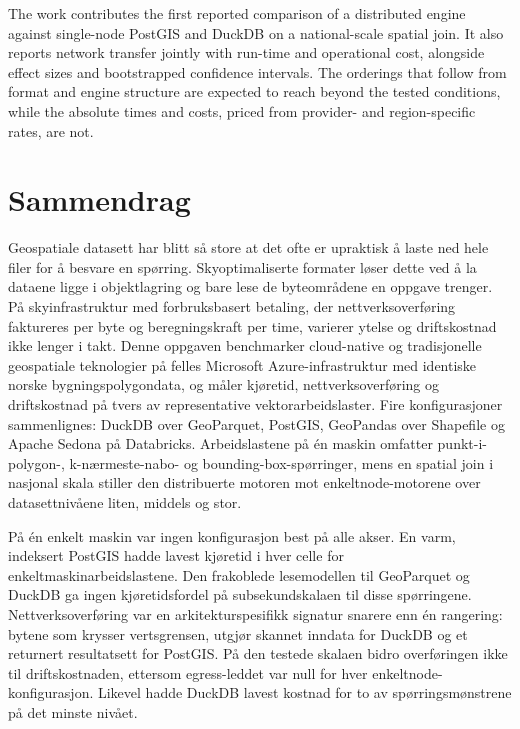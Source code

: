 The work contributes the first reported comparison of a distributed engine against single-node PostGIS and DuckDB on a national-scale spatial join. It also reports network transfer jointly with run-time and operational cost, alongside effect sizes and bootstrapped confidence intervals. The orderings that follow from format and engine structure are expected to reach beyond the tested conditions, while the absolute times and costs, priced from provider- and region-specific rates, are not.

\chapter*{Sammendrag}

Geospatiale datasett har blitt så store at det ofte er upraktisk å laste ned hele filer for å besvare en spørring. Skyoptimaliserte formater løser dette ved å la dataene ligge i objektlagring og bare lese de byteområdene en oppgave trenger. På skyinfrastruktur med forbruksbasert betaling, der nettverksoverføring faktureres per byte og beregningskraft per time, varierer ytelse og driftskostnad ikke lenger i takt. Denne oppgaven benchmarker cloud-native og tradisjonelle geospatiale teknologier på felles Microsoft Azure-infrastruktur med identiske norske bygningspolygondata, og måler kjøretid, nettverksoverføring og driftskostnad på tvers av representative vektorarbeidslaster. Fire konfigurasjoner sammenlignes: DuckDB over GeoParquet, PostGIS, GeoPandas over Shapefile og Apache Sedona på Databricks. Arbeidslastene på én maskin omfatter punkt-i-polygon-, k-nærmeste-nabo- og bounding-box-spørringer, mens en spatial join i nasjonal skala stiller den distribuerte motoren mot enkeltnode-motorene over datasettnivåene liten, middels og stor.

På én enkelt maskin var ingen konfigurasjon best på alle akser. En varm, indeksert PostGIS hadde lavest kjøretid i hver celle for enkeltmaskinarbeidslastene. Den frakoblede lesemodellen til GeoParquet og DuckDB ga ingen kjøretidsfordel på subsekundskalaen til disse spørringene. Nettverksoverføring var en arkitekturspesifikk signatur snarere enn én rangering: bytene som krysser vertsgrensen, utgjør skannet inndata for DuckDB og et returnert resultatsett for PostGIS. På den testede skalaen bidro overføringen ikke til driftskostnaden, ettersom egress-leddet var null for hver enkeltnode-konfigurasjon. Likevel hadde DuckDB lavest kostnad for to av spørringsmønstrene på det minste nivået.

